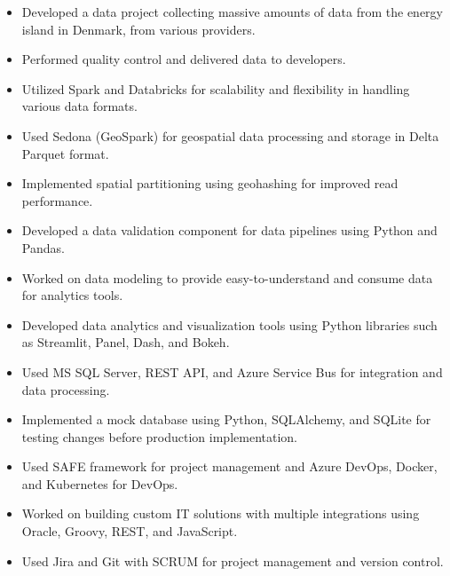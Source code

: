 
\begin{itemize}
\item Developed a data project collecting massive amounts of data from the energy island in Denmark, from various providers.
\item Performed quality control and delivered data to developers.
\item Utilized Spark and Databricks for scalability and flexibility in handling various data formats.
\item Used Sedona (GeoSpark) for geospatial data processing and storage in Delta Parquet format.
\item Implemented spatial partitioning using geohashing for improved read performance.
\end{itemize}

\divider

\begin{itemize}
\item Developed a data validation component for data pipelines using Python and Pandas.
\item Worked on data modeling to provide easy-to-understand and consume data for analytics tools.
\item Developed data analytics and visualization tools using Python libraries such as Streamlit, Panel, Dash, and Bokeh.
\item Used MS SQL Server, REST API, and Azure Service Bus for integration and data processing.
\item Implemented a mock database using Python, SQLAlchemy, and SQLite for testing changes before production implementation.
\item Used SAFE framework for project management and Azure DevOps, Docker, and Kubernetes for DevOps.
\end{itemize}

\divider

\begin{itemize}
\item Worked on building custom IT solutions with multiple integrations using Oracle, Groovy, REST, and JavaScript.
\item Used Jira and Git with SCRUM for project management and version control.
\end{itemize}

